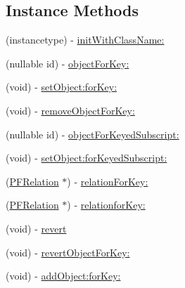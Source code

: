 \subsection*{Instance Methods}
\begin{DoxyCompactItemize}
\item 
(instancetype) -\/ \hyperlink{interface_p_f_object_ad98dd444e5e56becfc4e0682d93cd6e2}{init\+With\+Class\+Name\+:}
\begin{DoxyCompactList}\small\item\em 

 \end{DoxyCompactList}\item 
(nullable id) -\/ \hyperlink{interface_p_f_object_abb2cd7a39c135e27ff43f5f66957a04f}{object\+For\+Key\+:}
\begin{DoxyCompactList}\small\item\em 

 \end{DoxyCompactList}\item 
(void) -\/ \hyperlink{interface_p_f_object_ac433d818cd62eb486ce1fa6fb1ad5015}{set\+Object\+:for\+Key\+:}
\item 
(void) -\/ \hyperlink{interface_p_f_object_afcbbe0e25d243c361281ff2521188fa7}{remove\+Object\+For\+Key\+:}
\item 
(nullable id) -\/ \hyperlink{interface_p_f_object_a8720d483ed414f575c5a28f66fb7674b}{object\+For\+Keyed\+Subscript\+:}
\item 
(void) -\/ \hyperlink{interface_p_f_object_ada3691b1cedf6c9ac5d6725e6dbe99b9}{set\+Object\+:for\+Keyed\+Subscript\+:}
\item 
(\hyperlink{interface_p_f_relation}{P\+F\+Relation} $\ast$) -\/ \hyperlink{interface_p_f_object_ab846711592e4d81c38a11147410eb028}{relation\+For\+Key\+:}
\item 
(\hyperlink{interface_p_f_relation}{P\+F\+Relation} $\ast$) -\/ \hyperlink{interface_p_f_object_a5fcd143c041166de62dce229299f6354}{relationfor\+Key\+:}
\item 
(void) -\/ \hyperlink{interface_p_f_object_a4a9abfaab817df8b5710d8f8b78b7361}{revert}
\item 
(void) -\/ \hyperlink{interface_p_f_object_a2c8b259c286d468437a24445353404fe}{revert\+Object\+For\+Key\+:}
\item 
(void) -\/ \hyperlink{interface_p_f_object_a8b89e4344c41b638a82793e0ef79e60e}{add\+Object\+:for\+Key\+:}
\begin{DoxyCompactList}\small\item\em 


\end{DoxyCompactList}
\end{DoxyCompactItemize}
